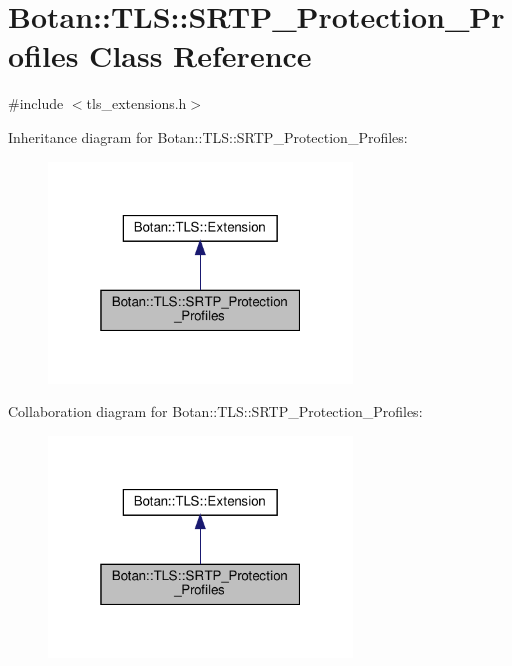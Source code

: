 \hypertarget{class_botan_1_1_t_l_s_1_1_s_r_t_p___protection___profiles}{}\section{Botan\+:\+:T\+LS\+:\+:S\+R\+T\+P\+\_\+\+Protection\+\_\+\+Profiles Class Reference}
\label{class_botan_1_1_t_l_s_1_1_s_r_t_p___protection___profiles}


{\ttfamily \#include $<$tls\+\_\+extensions.\+h$>$}



Inheritance diagram for Botan\+:\+:T\+LS\+:\+:S\+R\+T\+P\+\_\+\+Protection\+\_\+\+Profiles\+:
\nopagebreak
\begin{figure}[H]
\begin{center}
\leavevmode
\includegraphics[width=229pt]{class_botan_1_1_t_l_s_1_1_s_r_t_p___protection___profiles__inherit__graph}
\end{center}
\end{figure}


Collaboration diagram for Botan\+:\+:T\+LS\+:\+:S\+R\+T\+P\+\_\+\+Protection\+\_\+\+Profiles\+:
\nopagebreak
\begin{figure}[H]
\begin{center}
\leavevmode
\includegraphics[width=229pt]{class_botan_1_1_t_l_s_1_1_s_r_t_p___protection___profiles__coll__graph}
\end{center}
\end{figure}
